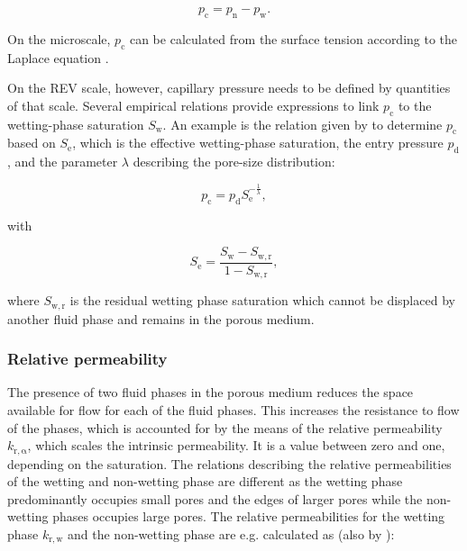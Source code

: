 \begin{equation}\label{eq:pc-pn_pw}
p_\mathrm{c} = p_\mathrm{n} - p_\mathrm{w}.
\end{equation}

On the microscale, $p_\mathrm{c}$ can be calculated from the surface tension 
according to the Laplace equation \citep[see][]{helmig1997multiphase}.

On the REV scale, however, capillary pressure needs to be defined by quantities of that scale. 
Several empirical relations provide expressions to link $p_\mathrm{c}$ to the wetting-phase saturation $S_\mathrm{w}$. 
An example is the relation given by \citet{brooks1964hydrau} %
to determine $p_\mathrm{c}$ based on 
$S_\mathrm{e}$, which is the effective wetting-phase saturation,
the entry pressure $p_\mathrm{d}$, and the parameter $\lambda$ describing the pore-size distribution:

\begin{equation}\label{eq:pc-Sw}
p_\mathrm{c} = p_\mathrm{d} S_\mathrm{e}^{-\frac{1}{\lambda}},
\end{equation}

with 

\begin{equation}\label{eq:Se}
S_\mathrm{e} = \frac{S_\mathrm{w}-S_\mathrm{w,r}}{1-S_\mathrm{w,r}},
\end{equation}

where $S_\mathrm{w,r}$ is the residual wetting phase saturation which cannot be displaced
by another fluid phase and remains in the porous medium.

\subsubsection{Relative permeability}\label{sec:kr}
The presence of two fluid phases in the porous medium reduces the space available for flow 
for each of the fluid phases. 
This increases the resistance to flow of the phases, which is accounted for by the means of 
the relative permeability $k_\mathrm{r,\alpha}$, which scales the intrinsic permeability. 
It is a value between zero and one, depending on the saturation. 
The relations describing the relative permeabilities of the wetting and non-wetting phase are different 
as the wetting phase predominantly occupies small pores and the edges of larger pores while the 
non-wetting phases occupies large pores.
The relative permeabilities for the wetting phase $k_\mathrm{r,w}$ and the non-wetting phase are e.g. calculated as (also by \citet{brooks1964hydrau}):

